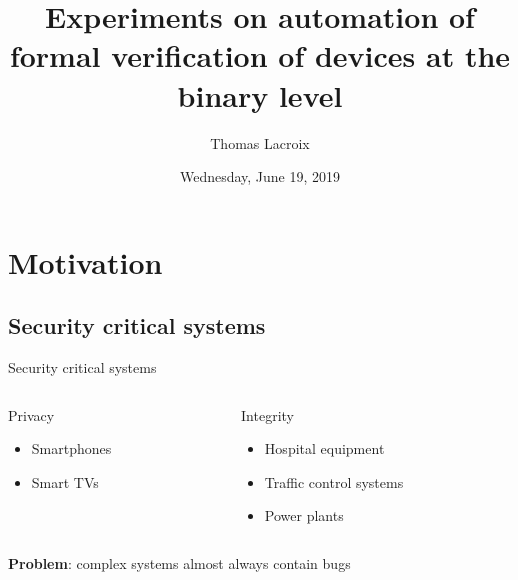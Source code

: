 \documentclass[xcolor={x11names}]{beamer}
\title[Soutenance de PFE]{Experiments on automation of formal verification of devices at the binary level}
\subtitle{}
\author{Thomas Lacroix}
\institute[]{INSA Lyon \\ Soutenance de PFE (Option R\&D)}
\date[19/06/2019]{Wednesday, June 19, 2019}
\begin{document}
\begin{frame}
    \maketitle
\end{frame}


\section{Motivation}


\subsection{Security critical systems}

\begin{frame}{Security critical systems}
    \begin{columns}
        \begin{column}{0.5\textwidth}
            Privacy

            \begin{itemize}
                \item Smartphones
                \item Smart TVs
            \end{itemize}
        \end{column}
        \begin{column}{0.5\textwidth}
            Integrity

            \begin{itemize}
                \item Hospital equipment
                \item Traffic control systems
                \item Power plants
            \end{itemize}
        \end{column}
    \end{columns}

    \vfill
    \pause

    \textbf{Problem}: complex systems almost always contain bugs
\end{frame}
\end{document}
